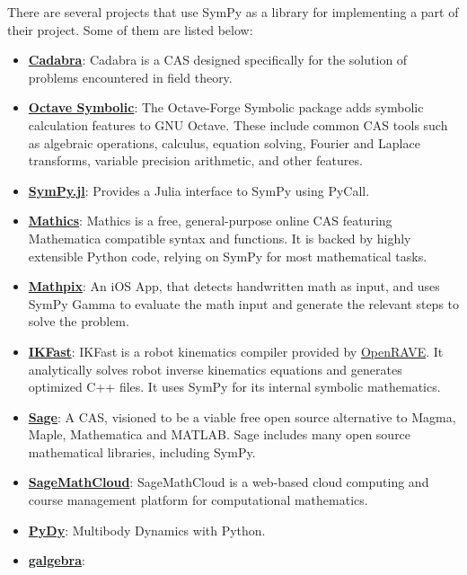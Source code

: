 There are several projects that use SymPy as a library for implementing
a part of their project. Some of them are listed below:

\begin{itemize}
\item
  \href{http://cadabra.science/index.html}{\textbf{Cadabra}}: Cadabra is
  a CAS designed specifically for the
  solution of problems encountered in field theory.
\item
  \href{http://octave.sourceforge.net/symbolic/}{\textbf{Octave Symbolic}}:
  The Octave-Forge Symbolic package adds symbolic calculation features
  to GNU Octave. These include common CAS tools such
  as algebraic operations, calculus, equation solving, Fourier and
  Laplace transforms, variable precision arithmetic, and other features.
\item
  \href{https://github.com/jverzani/SymPy.jl}{\textbf{SymPy.jl}}:
  Provides a Julia interface to SymPy using PyCall.
\item
  \href{https://mathics.github.io/}{\textbf{Mathics}}: Mathics is a
  free, general-purpose online CAS featuring Mathematica compatible
  syntax and functions. It is backed by highly extensible Python code,
  relying on SymPy for most mathematical tasks.
\item
  \href{http://mathpix.com/}{\textbf{Mathpix}}: An iOS App, that detects handwritten math as input, and uses
  SymPy Gamma to evaluate the math input and generate the relevant
  steps to solve the problem.
\item
  \href{http://openrave.org/docs/0.8.2/openravepy/ikfast/}{\textbf{IKFast}}:
  IKFast is a robot kinematics compiler provided by
  \href{http://openrave.org/}{OpenRAVE}. It analytically solves robot inverse
  kinematics equations and generates optimized C++ files. It uses SymPy for
  its internal symbolic mathematics.
\item
  \href{http://www.sagemath.org/}{\textbf{Sage}}: A CAS, visioned to be
  a viable free open source alternative to Magma, Maple, Mathematica and
  MATLAB\@. Sage includes many open source mathematical libraries, including
  SymPy.
\item
  \href{https://cloud.sagemath.com}{\textbf{SageMathCloud}}:
  SageMathCloud is a web-based cloud computing and course management
  platform for computational mathematics.
\item
  \href{http://www.pydy.org/}{\textbf{PyDy}}: Multibody Dynamics with
  Python.
\item
  \href{https://github.com/brombo/galgebra}{\textbf{galgebra}}:

\end{itemize}
